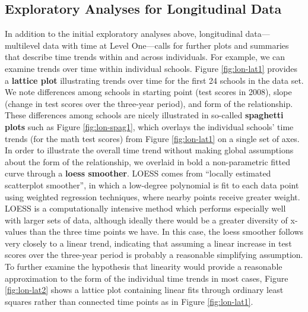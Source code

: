 \documentclass[
]{krantz}
\begin{document}
\hypertarget{longitudinalanalyses}{%
\subsection{Exploratory Analyses for Longitudinal Data}\label{longitudinalanalyses}}

In addition to the initial exploratory analyses above, longitudinal data---multilevel data with time at Level One---calls for further plots and summaries that describe time trends within and across individuals. For example, we can examine trends over time within individual schools. Figure \ref{fig:lon-lat1} provides a \textbf{lattice plot}  illustrating trends over time for the first 24 schools in the data set. We note differences among schools in starting point (test scores in 2008), slope (change in test scores over the three-year period), and form of the relationship. These differences among schools are nicely illustrated in so-called \textbf{spaghetti plots}  such as Figure \ref{fig:lon-spag1}, which overlays the individual schools' time trends (for the math test scores) from Figure \ref{fig:lon-lat1} on a single set of axes. In order to illustrate the overall time trend without making global assumptions about the form of the relationship, we overlaid in bold a non-parametric fitted curve through a \textbf{loess smoother}.  LOESS comes from ``locally estimated scatterplot smoother'', in which a low-degree polynomial is fit to each data point using weighted regression techniques, where nearby points receive greater weight. LOESS is a computationally intensive method which performs especially well with larger sets of data, although ideally there would be a greater diversity of x-values than the three time points we have. In this case, the loess smoother follows very closely to a linear trend, indicating that assuming a linear increase in test scores over the three-year period is probably a reasonable simplifying assumption. To further examine the hypothesis that linearity would provide a reasonable approximation to the form of the individual time trends in most cases, Figure \ref{fig:lon-lat2} shows a lattice plot containing linear fits through ordinary least squares rather than connected time points as in Figure \ref{fig:lon-lat1}.
\end{document}
